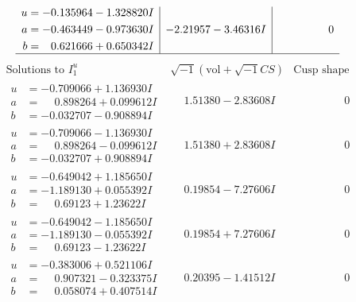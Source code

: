 \documentclass[1p]{elsarticle_modified}
\theoremstyle{definition}
\newcommand{\I}{\sqrt{-1}}
\begin{document}
$$\begin{array}{c|c|c}
\begin{aligned}
u &= -0.135964 - 1.328820 I \\
a &= -0.463449 - 0.973630 I \\
b &= \phantom{-}0.621666 + 0.650342 I\end{aligned}
 & -2.21957 - 3.46316 I & \phantom{-0.000000 } 0\\
 \hline 
 \end{array}$$\newpage$$\begin{array}{c|c|c}  
\text{Solutions to }I^u_{1}& \I (\text{vol} + \sqrt{-1}CS) & \text{Cusp shape}\\
 \hline 
\begin{aligned}
u &= -0.709066 + 1.136930 I \\
a &= \phantom{-}0.898264 + 0.099612 I \\
b &= -0.032707 - 0.908894 I\end{aligned}
 & \phantom{-}1.51380 - 2.83608 I & \phantom{-0.000000 } 0 \\ \hline\begin{aligned}
u &= -0.709066 - 1.136930 I \\
a &= \phantom{-}0.898264 - 0.099612 I \\
b &= -0.032707 + 0.908894 I\end{aligned}
 & \phantom{-}1.51380 + 2.83608 I & \phantom{-0.000000 } 0 \\ \hline\begin{aligned}
u &= -0.649042 + 1.185650 I \\
a &= -1.189130 + 0.055392 I \\
b &= \phantom{-}0.69123 + 1.23622 I\end{aligned}
 & \phantom{-}0.19854 - 7.27606 I & \phantom{-0.000000 } 0 \\ \hline\begin{aligned}
u &= -0.649042 - 1.185650 I \\
a &= -1.189130 - 0.055392 I \\
b &= \phantom{-}0.69123 - 1.23622 I\end{aligned}
 & \phantom{-}0.19854 + 7.27606 I & \phantom{-0.000000 } 0 \\ \hline\begin{aligned}
u &= -0.383006 + 0.521106 I \\
a &= \phantom{-}0.907321 - 0.323375 I \\
b &= \phantom{-}0.058074 + 0.407514 I\end{aligned}
 & \phantom{-}0.20395 - 1.41512 I & \phantom{-0.000000 } 0 \\ \hline\begin{aligned}

\end{aligned}
\end{array}$$
\end{document}
